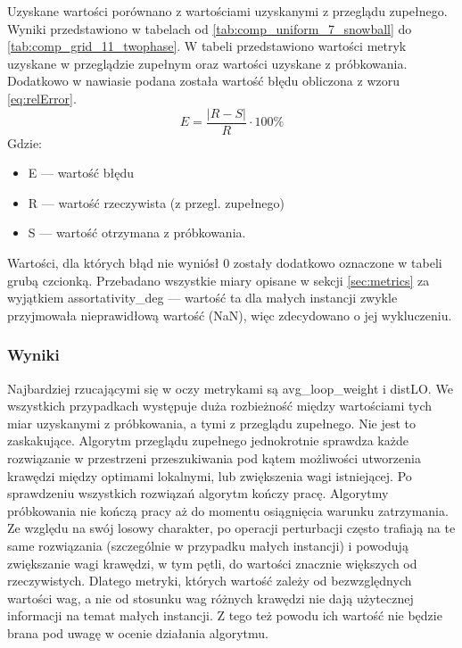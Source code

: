Uzyskane wartości porównano z wartościami uzyskanymi z przeglądu zupełnego.
Wyniki przedstawiono w tabelach od \ref{tab:comp_uniform_7_snowball} do \ref{tab:comp_grid_11_twophase}.
W tabeli przedstawiono wartości metryk uzyskane w przeglądzie zupełnym oraz wartości uzyskane z próbkowania.
Dodatkowo w nawiasie podana została wartość błędu obliczona z wzoru \ref{eq:relError}.
\begin{equation}
    \label{eq:relError}
    E = \frac{|R - S|}{R} \cdot 100\%
\end{equation}
Gdzie:
\begin{itemize}
    \item E --- wartość błędu
    \item R --- wartość rzeczywista (z przegl. zupełnego)
    \item S --- wartość otrzymana z próbkowania.
\end{itemize}

Wartości, dla których błąd nie wyniósł 0 zostały dodatkowo oznaczone w tabeli grubą czcionką.
Przebadano wszystkie miary opisane w sekcji \ref{sec:metrics} za wyjątkiem assortativity\_deg --- wartość ta dla małych instancji zwykle przyjmowała
nieprawidłową wartość (NaN), więc zdecydowano o jej wykluczeniu.

\subsubsection{Wyniki}



Najbardziej rzucającymi się w oczy metrykami są avg\_loop\_weight i distLO.
We wszystkich przypadkach występuje duża rozbieżność między wartościami tych miar uzyskanymi z próbkowania, a tymi z przeglądu zupełnego.
Nie jest to zaskakujące. Algorytm przeglądu zupełnego jednokrotnie sprawdza każde rozwiązanie w przestrzeni przeszukiwania pod kątem
możliwości utworzenia krawędzi między optimami lokalnymi, lub zwiększenia wagi istniejącej.
Po sprawdzeniu wszystkich rozwiązań algorytm kończy pracę.
Algorytmy próbkowania nie kończą pracy aż do momentu osiągnięcia warunku zatrzymania.
Ze względu na swój losowy charakter, po operacji perturbacji często trafiają na te same rozwiązania
(szczególnie w przypadku małych instancji) i powodują zwiększanie wagi krawędzi, w tym pętli, do wartości znacznie większych od rzeczywistych.
Dlatego metryki, których wartość zależy od bezwzględnych wartości wag, a nie od stosunku wag różnych krawędzi nie dają użytecznej informacji na temat małych instancji.
Z tego też powodu ich wartość nie będzie brana pod uwagę w ocenie działania algorytmu.

